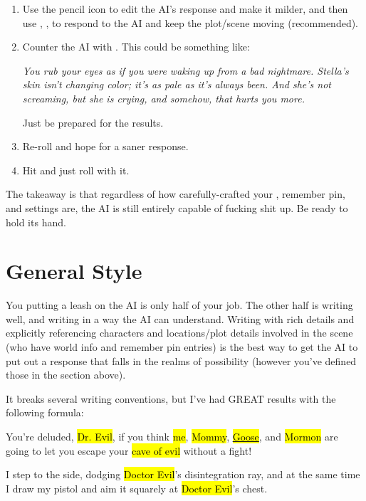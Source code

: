 \documentclass[Avsfag-main.tex]{subfiles}
\begin{document}
\begin{enumerate}
\item
  Use the pencil icon to edit the AI's response and make it milder, and
  then use \say, \Do, \story to respond to the AI and keep the
  plot/scene moving (recommended).
\item
  Counter the AI with \story. This could be something like:

  \emph{You rub your eyes as if you were waking up from a bad nightmare.
  Stella's skin isn't changing color; it's as pale as it's always been.
  And she's not screaming, but she is crying, and somehow, that hurts you more.}

  Just be prepared for the results.
\item
  Re-roll and hope for a saner response.
\item
  Hit \keys{\return} and just roll with it.
\end{enumerate}

The takeaway is that regardless of how carefully-crafted your \wi, remember pin, and settings are, the AI is still entirely capable of fucking shit up.
Be ready to hold its hand.

\section{General Style}

You putting a leash on the AI is only half of your job. The other half is writing well, and writing in a way the AI can understand.
Writing with rich details and explicitly referencing characters and
locations/plot details involved in the scene (who have world info and
remember pin entries) is the best way to get the AI to put out a
response that falls in the realms of possibility (however you've defined
those in the section above).

It breaks several writing conventions, but I've had GREAT results with
the following formula:


\begin{storyb}
	\say You're deluded, \hl{Dr. Evil}, if you think \hl{me}, \hl{Mommy},
	\href{https://www.youtube.com/watch?v=TDpXdCQIE1Q}{\hl{Goose}},
	and \hl{Mormon} are going to let you escape your \hl{cave of evil} without a fight!
\end{storyb}

\begin{storyb}
	\Do I step to the side, dodging \hl{Doctor Evil}'s disintegration ray, and at the same time I draw my pistol and aim it squarely at \hl{Doctor Evil}'s chest.
\end{storyb}
\end{document}

